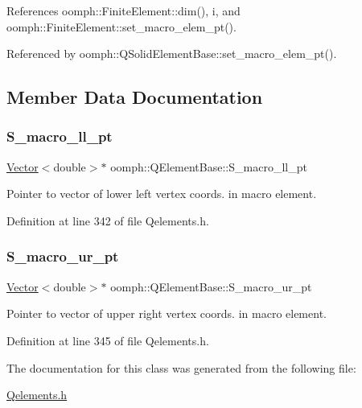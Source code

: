 References oomph\+::\+Finite\+Element\+::dim(), i, and oomph\+::\+Finite\+Element\+::set\+\_\+macro\+\_\+elem\+\_\+pt().



Referenced by oomph\+::\+Q\+Solid\+Element\+Base\+::set\+\_\+macro\+\_\+elem\+\_\+pt().



\subsection{Member Data Documentation}
\mbox{\label{classoomph_1_1QElementBase_ad4230bf2166814292978c6ea970a0ff1}} 
\subsubsection{\texorpdfstring{S\+\_\+macro\+\_\+ll\+\_\+pt}{S\_macro\_ll\_pt}}
{\footnotesize\ttfamily \hyperlink{classoomph_1_1Vector}{Vector}$<$double$>$$\ast$ oomph\+::\+Q\+Element\+Base\+::\+S\+\_\+macro\+\_\+ll\+\_\+pt\hspace{0.3cm}{\ttfamily [private]}}



Pointer to vector of lower left vertex coords. in macro element. 



Definition at line 342 of file Qelements.\+h.

\mbox{\label{classoomph_1_1QElementBase_a2799b73c77a7d6bcff3e0f78d6bf0876}} 
\subsubsection{\texorpdfstring{S\+\_\+macro\+\_\+ur\+\_\+pt}{S\_macro\_ur\_pt}}
{\footnotesize\ttfamily \hyperlink{classoomph_1_1Vector}{Vector}$<$double$>$$\ast$ oomph\+::\+Q\+Element\+Base\+::\+S\+\_\+macro\+\_\+ur\+\_\+pt\hspace{0.3cm}{\ttfamily [private]}}



Pointer to vector of upper right vertex coords. in macro element. 



Definition at line 345 of file Qelements.\+h.



The documentation for this class was generated from the following file\+:\begin{DoxyCompactItemize}
\item 
\hyperlink{Qelements_8h}{Qelements.\+h}\end{DoxyCompactItemize}

